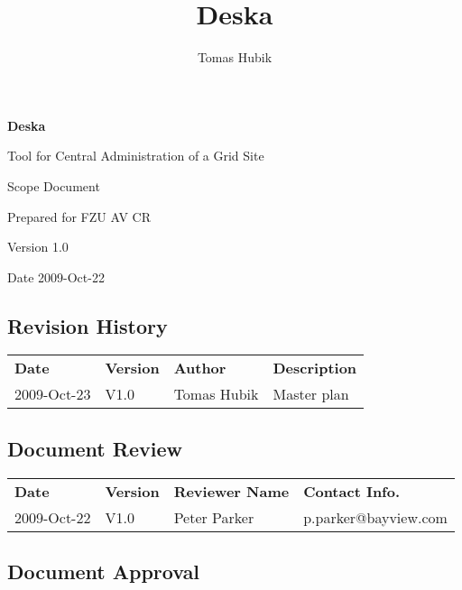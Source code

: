 \documentclass[12pt]{article}
\author{Tomas Hubik}
\title{Deska}
\begin{document}
{\Huge \textbf{Deska}}

\vspace{0.2in}

{\large Tool for Central Administration of a Grid Site}

\vspace{0.5in}

{\large Scope Document}

\vspace{0.2in}

{\large Prepared for FZU AV CR}

\vspace{0.2in}

{\large Version 1.0}

\vspace{0.2in}

{\large Date 2009-Oct-22}

\vspace{0.5in}

\subsection*{Revision History}

\begin{table}[!h]
	\begin{tabular}{l l l l}
		\textbf{Date} & \textbf{Version} & \textbf{Author} & \textbf{Description} \\
		2009-Oct-23 & V1.0 & Tomas Hubik & Master plan \\
	\end{tabular}
	\label{tab:RevisionHistory}
\end{table}


\subsection*{Document Review}

\begin{table}[!h]
	\begin{tabular}{l l l l}
		\textbf{Date} & \textbf{Version} & \textbf{Reviewer Name} & \textbf{Contact Info.} \\
		2009-Oct-22 & V1.0 & Peter Parker & p.parker@bayview.com \\
	\end{tabular}
	\label{tab:DocumentReview}
\end{table}


\subsection*{Document Approval}
\end{document}
